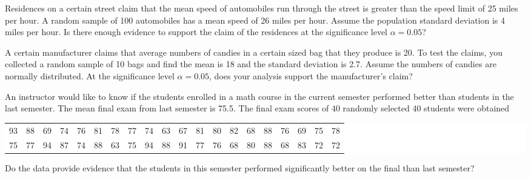 \begin{example}

Residences on a certain street claim that the mean speed of automobiles
run through the street is greater than the speed limit of 25 miles per
hour. A random sample of 100 automobiles has a mean speed of 26 miles
per hour. Assume the population standard deviation is 4 miles per hour.
Is there enough evidence to support the claim of the residences at the
significance level \(\alpha = 0.05\)?

\end{example}
\vspace*{6\baselineskip}

\begin{example}

A certain manufacturer claims that average numbers of candies in a
certain sized bag that they produce is 20. To test the claims, you
collected a random sample of 10 bags and find the mean is 18 and the
standard deviation is 2.7. Assume the numbers of candies are normally
distributed. At the significance level \(\alpha=0.05\), does your
analysis support the manufacturer's claim?

\end{example}
\vspace*{8\baselineskip}

\begin{example}

An instructor would like to know if the students enrolled in a math
course in the current semester performed better than students in the
last semester. The mean final exam from last semester is 75.5. The final
exam scores of 40 randomly selected 40 students were obtained

\begin{fullwidth}
  \colorbox{white}{
    \parbox{\linewidth}{
      \raggedleft
      \begin{tabular}{*{20}{c}}
        93 & 88 & 69 & 74 & 76 & 81 & 78 & 77 & 74 & 63 & 67 & 81 & 80 & 82 & 68 & 88 & 76 & 69 & 75 & 78\\
        75 & 77 & 94 & 87 & 74 & 88 & 63 & 75 & 94 & 88 & 91 & 77 & 76 & 68 & 80 & 88 & 68 & 83 & 72 & 72
      \end{tabular}
    }
  }
\end{fullwidth}

Do the data provide evidence that the students in this semester
performed significantly better on the final than last semester?

\end{example}
\vspace*{8\baselineskip}

